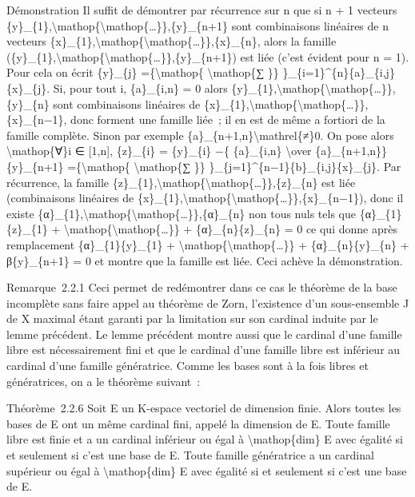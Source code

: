 \documentclass[]{article}
\begin{document}
Démonstration Il suffit de démontrer par récurrence sur n que si n + 1
vecteurs
\{y\}\_\{1\},\textbackslash{}mathop\{\textbackslash{}mathop\{\ldots{}\}\},\{y\}\_\{n+1\}
sont combinaisons linéaires de n vecteurs
\{x\}\_\{1\},\textbackslash{}mathop\{\textbackslash{}mathop\{\ldots{}\}\},\{x\}\_\{n\},
alors la famille
(\{y\}\_\{1\},\textbackslash{}mathop\{\textbackslash{}mathop\{\ldots{}\}\},\{y\}\_\{n+1\})
est liée (c'est évident pour n = 1). Pour cela on écrit \{y\}\_\{j\}
=\{\textbackslash{}mathop\{ \textbackslash{}mathop\{∑ \}\}
\}\_\{i=1\}\^{}\{n\}\{a\}\_\{i,j\}\{x\}\_\{j\}. Si, pour tout i,
\{a\}\_\{i,n\} = 0 alors
\{y\}\_\{1\},\textbackslash{}mathop\{\textbackslash{}mathop\{\ldots{}\}\},\{y\}\_\{n\}
sont combinaisons linéaires de
\{x\}\_\{1\},\textbackslash{}mathop\{\textbackslash{}mathop\{\ldots{}\}\},\{x\}\_\{n−1\},
donc forment une famille liée~; il en est de même a fortiori de la
famille complète. Sinon par exemple
\{a\}\_\{n+1,n\}\textbackslash{}mathrel\{≠\}0. On pose alors
\textbackslash{}mathop\{∀\}i ∈ {[}1,n{]}, \{z\}\_\{i\} = \{y\}\_\{i\}
−\{ \{a\}\_\{i,n\} \textbackslash{}over \{a\}\_\{n+1,n\}\}
\{y\}\_\{n+1\} =\{\textbackslash{}mathop\{ \textbackslash{}mathop\{∑
\}\} \}\_\{j=1\}\^{}\{n−1\}\{b\}\_\{i,j\}\{x\}\_\{j\}. Par récurrence,
la famille
\{z\}\_\{1\},\textbackslash{}mathop\{\textbackslash{}mathop\{\ldots{}\}\},\{z\}\_\{n\}
est liée (combinaisons linéaires de
\{x\}\_\{1\},\textbackslash{}mathop\{\textbackslash{}mathop\{\ldots{}\}\},\{x\}\_\{n−1\}),
donc il existe
\{α\}\_\{1\},\textbackslash{}mathop\{\textbackslash{}mathop\{\ldots{}\}\},\{α\}\_\{n\}
non tous nuls tels que \{α\}\_\{1\}\{z\}\_\{1\} +
\textbackslash{}mathop\{\textbackslash{}mathop\{\ldots{}\}\} +
\{α\}\_\{n\}\{z\}\_\{n\} = 0 ce qui donne après remplacement
\{α\}\_\{1\}\{y\}\_\{1\} +
\textbackslash{}mathop\{\textbackslash{}mathop\{\ldots{}\}\} +
\{α\}\_\{n\}\{y\}\_\{n\} + β\{y\}\_\{n+1\} = 0 et montre que la famille
est liée. Ceci achève la démonstration.

Remarque~2.2.1 Ceci permet de redémontrer dans ce cas le théorème de la
base incomplète sans faire appel au théorème de Zorn, l'existence d'un
sous-ensemble J de X maximal étant garanti par la limitation sur son
cardinal induite par le lemme précédent. Le lemme précédent montre aussi
que le cardinal d'une famille libre est nécessairement fini et que le
cardinal d'une famille libre est inférieur au cardinal d'une famille
génératrice. Comme les bases sont à la fois libres et génératrices, on a
le théorème suivant~:

Théorème~2.2.6 Soit E un K-espace vectoriel de dimension finie. Alors
toutes les bases de E ont un même cardinal fini, appelé la dimension de
E. Toute famille libre est finie et a un cardinal inférieur ou égal à
\textbackslash{}mathop\{dim\} E avec égalité si et seulement si c'est
une base de E. Toute famille génératrice a un cardinal supérieur ou égal
à \textbackslash{}mathop\{dim\} E avec égalité si et seulement si c'est
une base de E.
\end{document}
